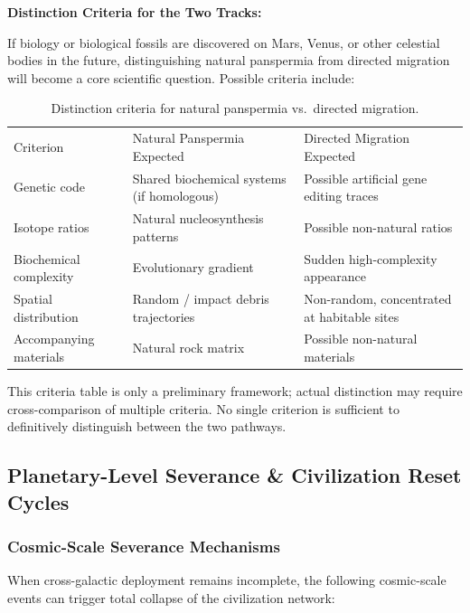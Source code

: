 \documentclass[aps,prd,twocolumn,superscriptaddress,nofootinbib]{revtex4-2}
\begin{document}
\textbf{Distinction Criteria for the Two Tracks:}

If biology or biological fossils are discovered on Mars, Venus, or other celestial bodies in the future, distinguishing natural panspermia from directed migration will become a core scientific question. Possible criteria include:

\begin{table}[htbp]
\caption{Distinction criteria for natural panspermia vs.\ directed migration.}
\label{tab:distinction-criteria}
\begin{ruledtabular}
\begin{tabular}{lll}
Criterion & Natural Panspermia Expected & Directed Migration Expected \\
\colrule
Genetic code & Shared biochemical systems (if homologous) & Possible artificial gene editing traces \\
Isotope ratios & Natural nucleosynthesis patterns & Possible non-natural ratios \\
Biochemical complexity & Evolutionary gradient & Sudden high-complexity appearance \\
Spatial distribution & Random / impact debris trajectories & Non-random, concentrated at habitable sites \\
Accompanying materials & Natural rock matrix & Possible non-natural materials \\
\end{tabular}
\end{ruledtabular}
\end{table}

This criteria table is only a preliminary framework; actual distinction may require cross-comparison of multiple criteria. No single criterion is sufficient to definitively distinguish between the two pathways.

\subsection{Planetary-Level Severance \& Civilization Reset Cycles}\label{sec:severance}

\subsubsection{Cosmic-Scale Severance Mechanisms}\label{sec:severance-mechanisms}

When cross-galactic deployment remains incomplete, the following cosmic-scale events can trigger total collapse of the civilization network:
\end{document}
